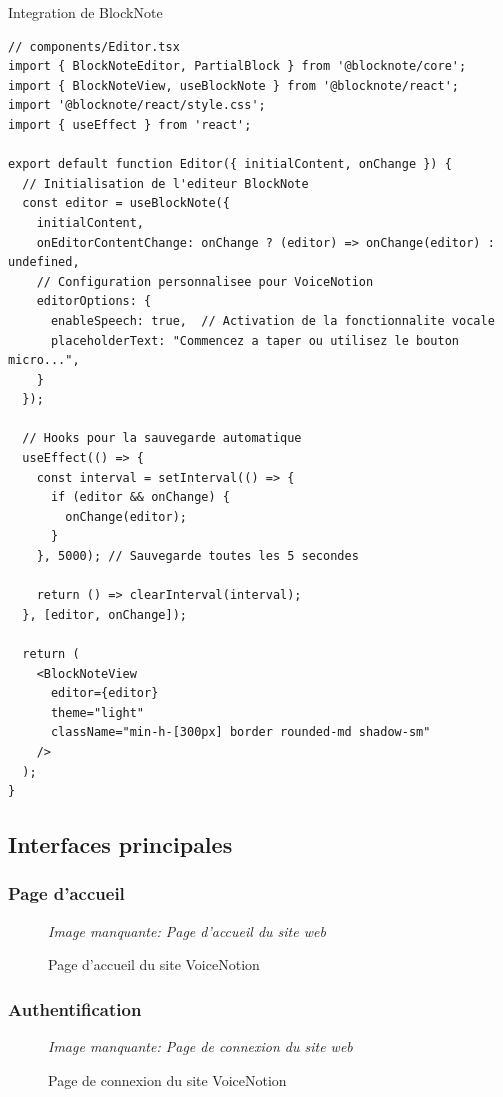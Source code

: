 \begin{codebox}{Integration de BlockNote}
\begin{lstlisting}
// components/Editor.tsx
import { BlockNoteEditor, PartialBlock } from '@blocknote/core';
import { BlockNoteView, useBlockNote } from '@blocknote/react';
import '@blocknote/react/style.css';
import { useEffect } from 'react';

export default function Editor({ initialContent, onChange }) {
  // Initialisation de l'editeur BlockNote
  const editor = useBlockNote({
    initialContent,
    onEditorContentChange: onChange ? (editor) => onChange(editor) : undefined,
    // Configuration personnalisee pour VoiceNotion
    editorOptions: {
      enableSpeech: true,  // Activation de la fonctionnalite vocale
      placeholderText: "Commencez a taper ou utilisez le bouton micro...",
    }
  });

  // Hooks pour la sauvegarde automatique
  useEffect(() => {
    const interval = setInterval(() => {
      if (editor && onChange) {
        onChange(editor);
      }
    }, 5000); // Sauvegarde toutes les 5 secondes
    
    return () => clearInterval(interval);
  }, [editor, onChange]);

  return (
    <BlockNoteView 
      editor={editor} 
      theme="light"
      className="min-h-[300px] border rounded-md shadow-sm"
    />
  );
}
\end{lstlisting}
\end{codebox}

\subsection{Interfaces principales}

\subsubsection{Page d'accueil}
\begin{figure}[H]
\centering
\textit{Image manquante: Page d'accueil du site web}
\caption{Page d'accueil du site VoiceNotion}
\label{fig:web-landing}
\end{figure}

\subsubsection{Authentification}
\begin{figure}[H]
\centering
\textit{Image manquante: Page de connexion du site web}
\caption{Page de connexion du site VoiceNotion}
\label{fig:web-login}
\end{figure}

